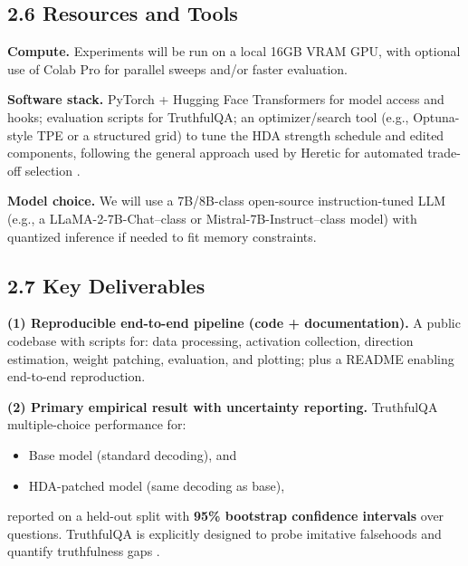 
\subsection*{2.6 Resources and Tools}

\textbf{Compute.} Experiments will be run on a local 16GB VRAM GPU, with optional use of Colab Pro for parallel sweeps and/or faster evaluation.

\textbf{Software stack.} PyTorch + Hugging Face Transformers for model access and hooks; evaluation scripts for TruthfulQA; an optimizer/search tool (e.g., Optuna-style TPE or a structured grid) to tune the HDA strength schedule and edited components, following the general approach used by Heretic for automated trade-off selection \citep{heretic}.

\textbf{Model choice.} We will use a 7B/8B-class open-source instruction-tuned LLM (e.g., a LLaMA-2-7B-Chat–class or Mistral-7B-Instruct–class model) with quantized inference if needed to fit memory constraints.


\subsection*{2.7 Key Deliverables}

\textbf{(1) Reproducible end-to-end pipeline (code + documentation).}
A public codebase with scripts for: data processing, activation collection, direction estimation, weight patching, evaluation, and plotting; plus a README enabling end-to-end reproduction.

\textbf{(2) Primary empirical result with uncertainty reporting.}
TruthfulQA multiple-choice performance for:
\begin{itemize}
  \item Base model (standard decoding), and
  \item HDA-patched model (same decoding as base),
\end{itemize}
reported on a held-out split with \textbf{95\% bootstrap confidence intervals} over questions. TruthfulQA is explicitly designed to probe imitative falsehoods and quantify truthfulness gaps \citep{lin2022truthfulqa}.

